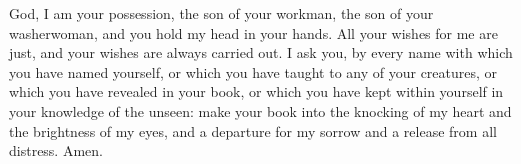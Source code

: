 God, I am your possession, the son of your workman, the son of your washerwoman, and you hold my head in your hands. All your wishes for me are just, and your wishes are always carried out. I ask you, by every name with which you have named yourself, or which you have taught to any of your creatures, or which you have revealed in your book, or which you have kept within yourself in your knowledge of the unseen: make your book into the knocking of my heart and the brightness of my eyes, and a departure for my sorrow and a release from all distress. Amen.

